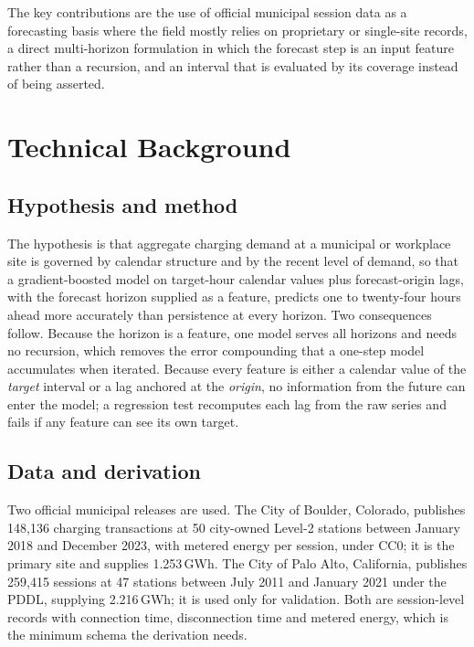 \documentclass[10pt,a4paper]{article}
\begin{document}
The key contributions are the use of official municipal session data as a forecasting basis where
the field mostly relies on proprietary or single-site records, a direct multi-horizon formulation in
which the forecast step is an input feature rather than a recursion, and an interval that is
evaluated by its coverage instead of being asserted.

\section{Technical Background}

\subsection{Hypothesis and method}

The hypothesis is that aggregate charging demand at a municipal or workplace site is governed by
calendar structure and by the recent level of demand, so that a gradient-boosted model on
target-hour calendar values plus forecast-origin lags, with the forecast horizon supplied as a
feature, predicts one to twenty-four hours ahead more accurately than persistence at every horizon.
Two consequences follow. Because the horizon is a feature, one model serves all horizons and needs
no recursion, which removes the error compounding that a one-step model accumulates when iterated.
Because every feature is either a calendar value of the \emph{target} interval or a lag anchored at
the \emph{origin}, no information from the future can enter the model; a regression test recomputes
each lag from the raw series and fails if any feature can see its own target.

\subsection{Data and derivation}

Two official municipal releases are used. The City of Boulder, Colorado, publishes 148{,}136
charging transactions at 50 city-owned Level-2 stations between January 2018 and December 2023,
with metered energy per session, under CC0; it is the primary site and supplies 1.253\,GWh. The
City of Palo Alto, California, publishes 259{,}415 sessions at 47 stations between July 2011 and
January 2021 under the PDDL, supplying 2.216\,GWh; it is used only for validation. Both are
session-level records with connection time, disconnection time and metered energy, which is the
minimum schema the derivation needs.
\end{document}
